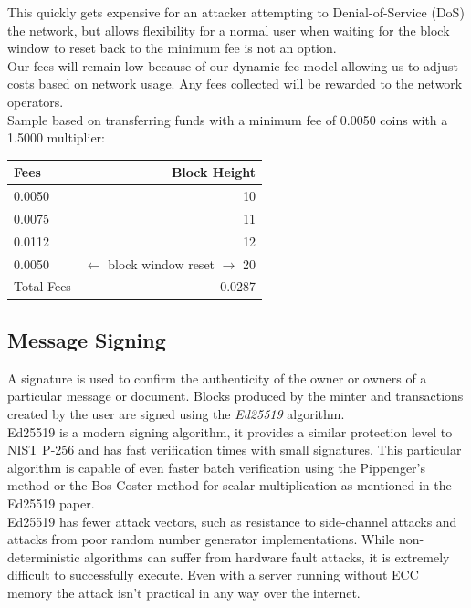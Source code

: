 \documentclass[12pt,a4paper]{article}
\begin{document}
  This quickly gets expensive for an attacker attempting to Denial-of-Service
  (DoS) the network, but allows flexibility for a normal user when waiting for
  the block window to reset back to the minimum fee is not an option.\\

  Our fees will remain low because of our dynamic fee model allowing us to
  adjust costs based on network usage. Any fees collected will be rewarded to
  the network operators.\\

  \newpage
  Sample based on transferring funds with a minimum fee of 0.0050 coins with a
  1.5000 multiplier:

  \vspace{3mm}
  \begin{tabular}{@{}lr@{}}
    Fees & Block Height     \\ \toprule
    0.0050 & 10             \\
    0.0075 & 11             \\
    0.0112 & 12             \\
    0.0050 & $\leftarrow{}$ block window reset $\rightarrow{}$ 20 \\ \midrule{}
    Total Fees & 0.0287     \\
    \bottomrule
  \end{tabular}

  \subsection{Message Signing}
  A signature is used to confirm the authenticity of the owner or owners of a
  particular message or document. Blocks produced by the minter and transactions
  created by the user are signed using the \textit{Ed25519}\cite{ed25519}
  algorithm.\\

  Ed25519 is a modern signing algorithm, it provides a similar protection level
  to NIST P-256 and has fast verification times with small signatures. This
  particular algorithm is capable of even faster batch verification using the
  Pippenger's method or the Bos-Coster method for scalar multiplication as
  mentioned in the Ed25519 paper.\\

  Ed25519 has fewer attack vectors, such as resistance to side-channel attacks
  and attacks from poor random number generator implementations. While
  non-deterministic algorithms can suffer from hardware fault attacks, it is
  extremely difficult to successfully execute. Even with a server running
  without ECC memory the attack isn't practical in any way over the
  internet.
\end{document}

